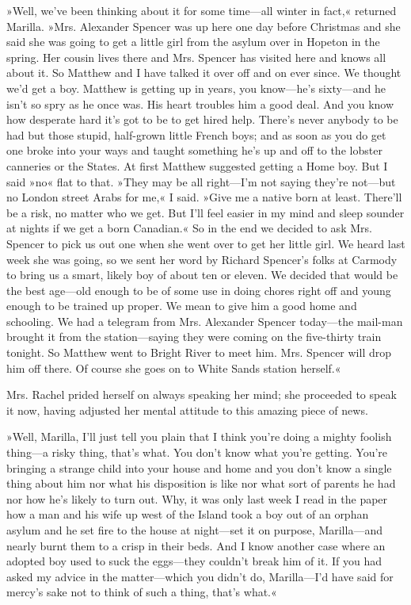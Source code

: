 »Well, we've been thinking about it for some time—all winter in fact,« returned Marilla. »Mrs. Alexander Spencer was up here one day before Christmas and she said she was going to get a little girl from the asylum over in Hopeton in the spring. Her cousin lives there and Mrs. Spencer has visited here and knows all about it. So Matthew and I have talked it over off and on ever since. We thought we'd get a boy. Matthew is getting up in years, you know—he's sixty—and he isn't so spry as he once was. His heart troubles him a good deal. And you know how desperate hard it's got to be to get hired help. There's never anybody to be had but those stupid, half-grown little French boys; and as soon as you do get one broke into your ways and taught something he's up and off to the lobster canneries or the States. At first Matthew suggested getting a Home boy. But I said »no« flat to that. »They may be all right—I'm not saying they're not—but no London street Arabs for me,« I said. »Give me a native born at least. There'll be a risk, no matter who we get. But I'll feel easier in my mind and sleep sounder at nights if we get a born Canadian.« So in the end we decided to ask Mrs. Spencer to pick us out one when she went over to get her little girl. We heard last week she was going, so we sent her word by Richard Spencer's folks at Carmody to bring us a smart, likely boy of about ten or eleven. We decided that would be the best age—old enough to be of some use in doing chores right off and young enough to be trained up proper. We mean to give him a good home and schooling. We had a telegram from Mrs. Alexander Spencer today—the mail-man brought it from the station—saying they were coming on the five-thirty train tonight. So Matthew went to Bright River to meet him. Mrs. Spencer will drop him off there. Of course she goes on to White Sands station herself.«

Mrs. Rachel prided herself on always speaking her mind; she proceeded to speak it now, having adjusted her mental attitude to this amazing piece of news.

»Well, Marilla, I'll just tell you plain that I think you're doing a mighty foolish thing—a risky thing, that's what. You don't know what you're getting. You're bringing a strange child into your house and home and you don't know a single thing about him nor what his disposition is like nor what sort of parents he had nor how he's likely to turn out. Why, it was only last week I read in the paper how a man and his wife up west of the Island took a boy out of an orphan asylum and he set fire to the house at night—set it on purpose, Marilla—and nearly burnt them to a crisp in their beds. And I know another case where an adopted boy used to suck the eggs—they couldn't break him of it. If you had asked my advice in the matter—which you didn't do, Marilla—I'd have said for mercy's sake not to think of such a thing, that's what.«

